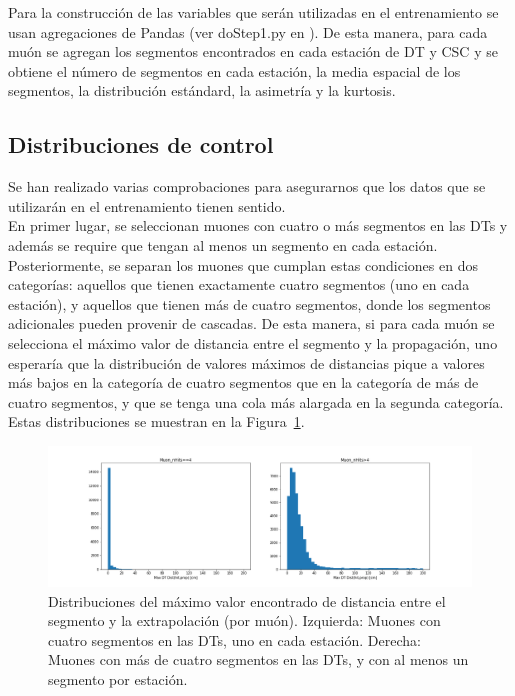 Para la construcci\'on de las variables que ser\'an utilizadas en el entrenamiento se usan agregaciones de Pandas (ver doStep1.py en \cite{processor}). De esta manera, para cada mu\'on se agregan los segmentos encontrados en cada estaci\'on de DT y CSC y se obtiene el n\'umero de segmentos en cada estaci\'on, la media espacial de los segmentos, la distribuci\'on est\'andard, la asimetr\'ia y la kurtosis.



\subsection{Distribuciones de control}\label{sec:plots}

Se han realizado varias comprobaciones para asegurarnos que los datos que se utilizar\'an en el entrenamiento tienen sentido. \\

En primer lugar, se seleccionan muones con cuatro o m\'as segmentos en las DTs y adem\'as se require que tengan al menos un segmento en cada estaci\'on. Posteriormente, se separan los muones que cumplan estas condiciones en dos categor\'ias: aquellos que tienen exactamente cuatro segmentos (uno en cada estaci\'on), y aquellos que tienen m\'as de cuatro segmentos, donde los segmentos adicionales pueden provenir de cascadas. De esta manera, si para cada mu\'on se selecciona el m\'aximo valor de distancia entre el segmento y la propagaci\'on, uno esperar\'ia que la distribuci\'on de valores m\'aximos de distancias pique a valores m\'as bajos en la categor\'ia de cuatro segmentos que en la categor\'ia de m\'as de cuatro segmentos, y que se tenga una cola m\'as alargada en la segunda categor\'ia. Estas distribuciones se muestran en la Figura~\ref{fig:data_dist}. \\

\begin{figure}[h]
\centering
\includegraphics[width=1.0\textwidth]{figures/data_simple_dist_postCleaning.png}
\caption{Distribuciones del m\'aximo valor encontrado de distancia entre el segmento y la extrapolaci\'on (por mu\'on). Izquierda: Muones con cuatro segmentos en las DTs, uno en cada estaci\'on. Derecha: Muones con m\'as de cuatro segmentos en las DTs, y con al menos un segmento por estaci\'on.}
\label{fig:data_dist}        
\end{figure}


